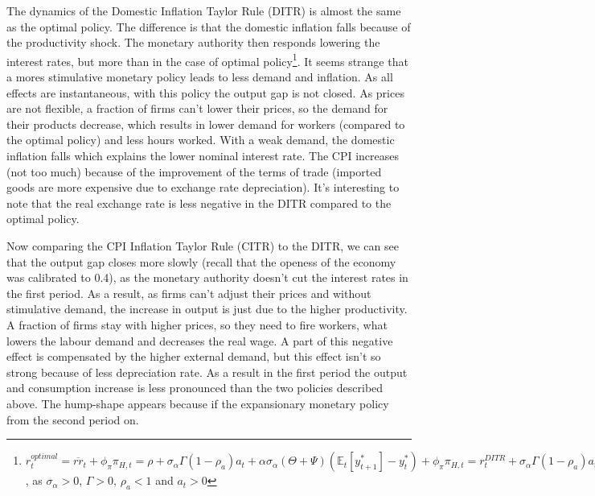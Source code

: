 \documentclass{article}
\newcommand{\Et}{\mathbb{E}_t}
\begin{document}
The dynamics of the Domestic Inflation Taylor Rule (DITR) is almost the same as the optimal policy. The difference is that the domestic inflation falls because of the productivity shock. The monetary authority then responds lowering the interest rates, but more than in the case of optimal policy\footnote{$r_t^{optimal} = \overline{rr}_t + \phi_{\pi}\pi_{H,t} = \rho + \sigma_\alpha \Gamma (1 - \rho_a) a_t + \alpha \sigma_\alpha (\Theta + \Psi)(\Et[y_{t+1}^*] - y_t^*) + \phi_{\pi}\pi_{H,t} = r_t^{DITR} + \sigma_\alpha \Gamma (1 - \rho_a) a_t + \alpha \sigma_\alpha (\Theta + \Psi)0 > r_t^{DITR}$, as $\sigma_\alpha>0$, $\Gamma>0$, $\rho_a<1$ and $a_t>0$}. It seems strange that a mores stimulative monetary policy leads to less demand and inflation. As all effects are instantaneous, with this policy the output gap is not closed. As prices are not flexible, a fraction of firms can't lower their prices, so the demand for their products decrease, which results in lower demand for workers (compared to the optimal policy) and less hours worked. With a weak demand, the domestic inflation falls which explains the lower nominal interest rate. The CPI increases (not too much) because of the improvement of the terms of trade (imported goods are more expensive due to exchange rate depreciation). It's interesting to note that the real exchange rate is less negative in the DITR compared to the optimal policy.   

\vspace{6pt}

Now comparing the CPI Inflation Taylor Rule (CITR) to the DITR, we can see that the output gap closes more slowly (recall that the openess of the economy was calibrated to 0.4), as the monetary authority doesn't cut the interest rates in the first period. As a result, as firms can't adjust their prices and without stimulative demand, the increase in output is just due to the higher productivity. A fraction of firms stay with higher prices, so they need to fire workers, what lowers the labour demand and decreases the real wage. A part of this negative effect is compensated by the higher external demand, but this effect isn't so strong because of less depreciation rate. As a result in the first period the output and consumption increase is less pronounced than the two policies described above. The hump-shape appears because if the expansionary monetary policy from the second period on. 

\vspace{6pt}
\end{document}
